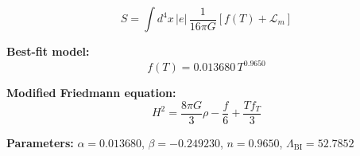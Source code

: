 
\begin{equation}
  S = \int d^4x \, |e| \, \frac{1}{16\pi G} \left[ f(T) + \mathcal{L}_m \right]
\end{equation}

\textbf{Best-fit model:}
\begin{equation}
  f(T) = 0.013680 \, T^{0.9650}
\end{equation}

\textbf{Modified Friedmann equation:}
\begin{equation}
  H^2 = \frac{8\pi G}{3} \rho - \frac{f}{6} + \frac{T f_T}{3}
\end{equation}

\textbf{Parameters:}
$\alpha = 0.013680$, \quad
$\beta = -0.249230$, \quad
$n = 0.9650$, \quad
$\Lambda_{\text{BI}} = 52.7852$